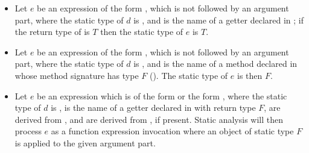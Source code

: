 \documentclass[makeidx]{article}
\begin{document}
\begin{itemize}
\item
  Let $e$ be an expression of the form ,
  which is not followed by an argument part,
  where the static type of $d$ is \DYNAMIC,
  and \id{} is the name of a getter declared in ;
  if the return type of  is $T$ then
  the static type of $e$ is $T$.

\item
  Let $e$ be an expression of the form ,
  which is not followed by an argument part,
  where the static type of $d$ is \DYNAMIC,
  and \id{} is the name of a method declared in 
  whose method signature has type $F$
  ().
  The static type of $e$ is then $F$.

\item
  Let $e$ be an expression which is of the form
  or the form ,
  where the static type of $d$ is \DYNAMIC,
  \id{} is the name of a getter declared in  with return type $F$,
   are derived from , and
   are derived from , if present.
  Static analysis will then process $e$ as a function expression invocation
  where an object of static type $F$ is applied to the given argument part.


\end{itemize}
\end{document}
